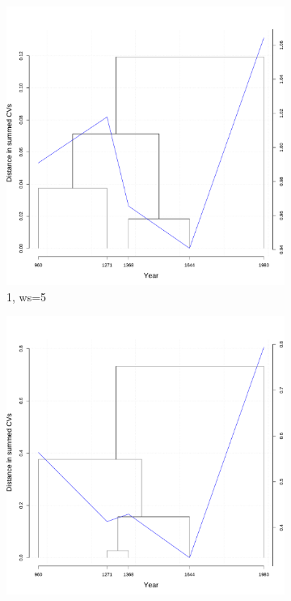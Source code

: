\begin{figure}[H]
  \medskip
  \begin{subfigure}{0.3\textwidth}
    \includegraphics[width=\linewidth]{figures_new/measures/VNC_measure_dist_w5_first_embed.pdf}
    \caption*{1\sts  , ws=5}
  \end{subfigure}
  \quad
  \begin{subfigure}{0.3\textwidth}
    \includegraphics[width=\linewidth]{figures_new/measures/VNC_measure_dist_w5_second_embed_global.pdf}

\end{subfigure}
\end{figure}
